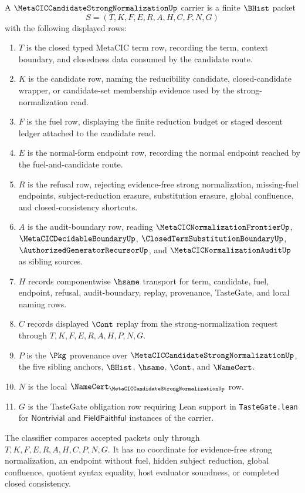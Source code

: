 \begin{definition}
\label{def:metacic-candidate-strong-normalization-carrier}
A $\MetaCICCandidateStrongNormalizationUp$ carrier is a finite $\BHist$ packet
$$
S=(T,K,F,E,R,A,H,C,P,N,G)
$$
with the following displayed rows:
\begin{enumerate}
\item $T$ is the closed typed MetaCIC term row, recording the term, context boundary, and closedness data consumed by the candidate route.
\item $K$ is the candidate row, naming the reducibility candidate, closed-candidate wrapper, or candidate-set membership evidence used by the strong-normalization read.
\item $F$ is the fuel row, displaying the finite reduction budget or staged descent ledger attached to the candidate read.
\item $E$ is the normal-form endpoint row, recording the normal endpoint reached by the fuel-and-candidate route.
\item $R$ is the refusal row, rejecting evidence-free strong normalization, missing-fuel endpoints, subject-reduction erasure, substitution erasure, global confluence, and closed-consistency shortcuts.
\item $A$ is the audit-boundary row, reading $\MetaCICNormalizationFrontierUp$, $\MetaCICDecidableBoundaryUp$, $\ClosedTermSubstitutionBoundaryUp$, $\AuthorizedGeneratorRecursorUp$, and $\MetaCICNormalizationAuditUp$ as sibling sources.
\item $H$ records componentwise $\hsame$ transport for term, candidate, fuel, endpoint, refusal, audit-boundary, replay, provenance, TasteGate, and local naming rows.
\item $C$ records displayed $\Cont$ replay from the strong-normalization request through $T,K,F,E,R,A,H,P,N,G$.
\item $P$ is the $\Pkg$ provenance over $\MetaCICCandidateStrongNormalizationUp$, the five sibling anchors, $\BHist$, $\hsame$, $\Cont$, and $\NameCert$.
\item $N$ is the local $\NameCert_{\MetaCICCandidateStrongNormalizationUp}$ row.
\item $G$ is the TasteGate obligation row requiring Lean support in \texttt{TasteGate.lean} for $\mathsf{Nontrivial}$ and $\mathsf{FieldFaithful}$ instances of the carrier.
\end{enumerate}
The classifier compares accepted packets only through $T,K,F,E,R,A,H,C,P,N,G$. It has no coordinate for evidence-free strong normalization, an endpoint without fuel, hidden subject reduction, global confluence, quotient syntax equality, host evaluator soundness, or completed closed consistency.
\end{definition}

